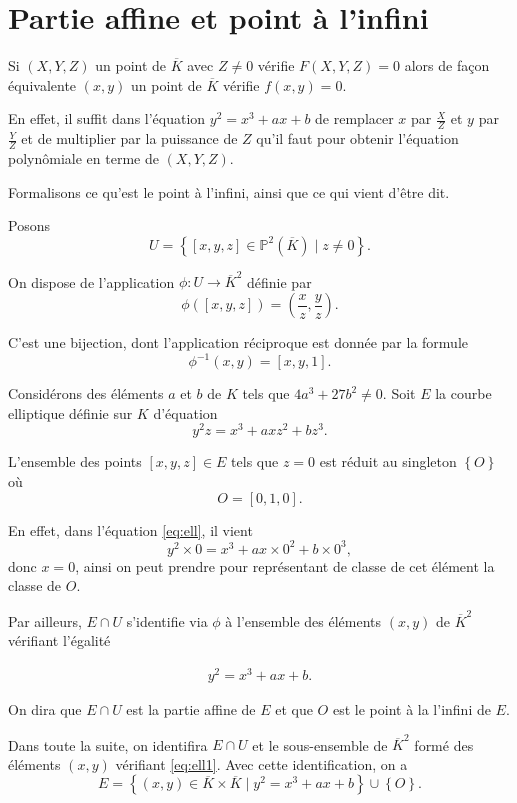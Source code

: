 \section{Partie affine et point à l'infini}

Si $(X,Y,Z)$ un point de $\overline{K}$ avec $Z\neq 0$ vérifie $F(X,Y,Z)=0$ alors de façon équivalente $(x,y)$ un point de $\overline{K}$ vérifie $f(x,y)=0$.

En effet, il suffit dans l'équation $y^2=x^3+ax+b$ de remplacer $x$ par $\frac{X}{Z}$ et $y$ par $\frac{Y}{Z}$ et de multiplier par la puissance de $Z$ qu'il faut pour obtenir l'équation polynômiale en terme de $(X,Y,Z)$.

Formalisons ce qu'est le point à l'infini, ainsi que ce qui vient d'être dit.

Posons 
\[
U = \left\{ [x,y,z] \in \mathbb{P}^2(\overline{K}) \mid z \neq 0 \right\} 
.\] 

On dispose de l'application $\phi : U \to \overline{K}^2$ définie par
\[
\phi([x,y,z])=\left( \frac{x}{z},\frac{y}{z} \right) 
.\] 

C'est une bijection, dont l'application réciproque est donnée par la formule
\[
\phi^{-1}(x,y)=\left[ x,y,1 \right] 
.\] 

Considérons des éléments $a$ et $b$ de $K$ tels que $4a^3+27b^2 \neq 0$. Soit $E$ la courbe elliptique définie sur $K$ d'équation 
\[
y^2z=x^3+axz^2+bz^3
.\] 

L'ensemble des points $[x,y,z] \in E$ tels que $z=0$ est réduit au singleton $\left\{ O \right\} $ où
\[
O = [0,1,0]
.\] 

En effet, dans l'équation \eqref{eq:ell}, il vient
\[
y^2\times 0 = x^3 + ax \times 0^2 + b \times 0^3
,\] 
donc $x=0$, ainsi on peut prendre pour représentant de classe de cet élément la classe de $O$.

Par ailleurs, $E \cap U$ s'identifie via $\phi$ à l'ensemble des éléments $(x,y)$ de $\overline{K}^2$ vérifiant l'égalité

\begin{align}
    \label{eq:ell1}
y^2 = x^3 + ax + b
.\end{align}

On dira que $E \cap U$ est la partie affine de $E$ et que $O$ est le point à la l'infini de $E$.

Dans toute la suite, on identifira $E \cap U$ et le sous-ensemble de $\overline{K}^2$ formé des éléments $(x,y)$ vérifiant \eqref{eq:ell1}. Avec cette identification, on a 
\[
E = \left\{ (x,y) \in \overline{K} \times \overline{K} \mid y^2=x^3+ax+b \right\} \cup \left\{ O \right\} 
.\] 

